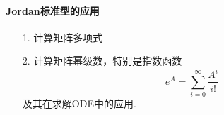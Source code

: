\paragraph{Jordan标准型的应用}
\begin{itemize}
    \item [1. ] 计算矩阵多项式
    \item [2. ] 计算矩阵幂级数，特别是指数函数
    $$e^{A} = \sum_{i=0}^{\infty} \frac{A^i}{i!}$$
    及其在求解ODE中的应用.
    \begin{itemize}


\end{itemize}
\end{itemize}
